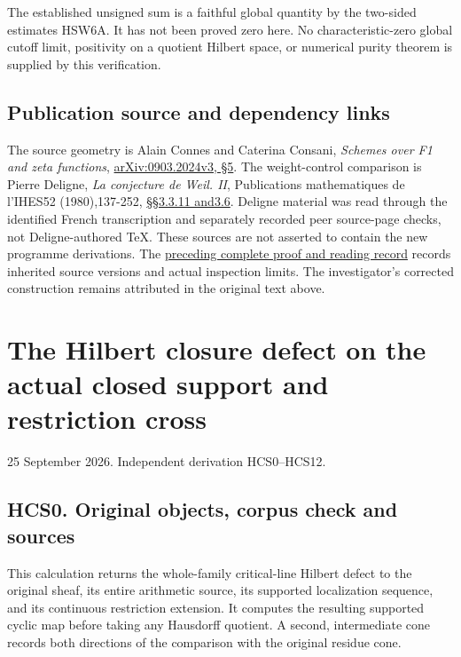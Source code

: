 The established unsigned sum is a faithful global quantity by the
two-sided estimates HSW6A. It has not been proved zero here. No
characteristic-zero global cutoff limit, positivity on a quotient
Hilbert space, or numerical purity theorem is supplied by this
verification.

\section{Publication source and dependency
links}\label{publication-source-and-dependency-links-18}

The source geometry is Alain Connes and Caterina Consani, \emph{Schemes
over F1 and zeta functions},
\href{https://arxiv.org/abs/0903.2024v3}{arXiv:0903.2024v3, §5}. The
weight-control comparison is Pierre Deligne, \emph{La conjecture de
Weil. II}, Publications mathematiques de l'IHES52 (1980),137-252,
\href{https://www.numdam.org/item/PMIHES_1980__52__137_0/}{§§3.3.11
and3.6}. Deligne material was read through the identified French
transcription and separately recorded peer source-page checks, not
Deligne-authored TeX. These sources are not asserted to contain the new
programme derivations. The
\href{https://github.com/KokunoYumeto/zeta-function-research-reader/blob/36a82ecca98addb8a98b48204e349737856c7223/workbenches/splitzero-tandem/continuations/20260924-cohomology-weight-and-character-lifts/BUILD_AND_REVIEW.md}{preceding
complete proof and reading record} records inherited source versions and
actual inspection limits. The investigator's corrected construction
remains attributed in the original text above.

\chapter{The Hilbert closure defect on the actual closed support and
restriction
cross}\label{the-hilbert-closure-defect-on-the-actual-closed-support-and-restriction-cross}

25 September 2026. Independent derivation HCS0--HCS12.

\section{HCS0. Original objects, corpus check and
sources}\label{hcs0.-original-objects-corpus-check-and-sources}

This calculation returns the whole-family critical-line Hilbert defect
to the original sheaf, its entire arithmetic source, its supported
localization sequence, and its continuous restriction extension. It
computes the resulting supported cyclic map before taking any Hausdorff
quotient. A second, intermediate cone records both directions of the
comparison with the original residue cone.

